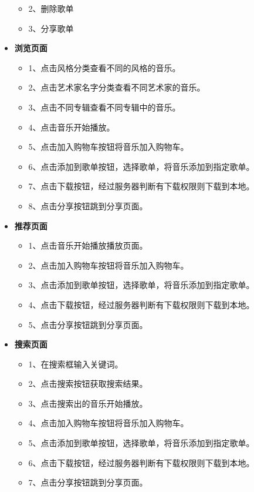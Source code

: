 \begin{itemize}
\begin{itemize}
		\item \textbf{}2、删除歌单
		\item \textbf{}3、分享歌单
	\end{itemize}
	\item \textbf{浏览页面}
	\begin{itemize}
		\item \textbf{}1、点击风格分类查看不同的风格的音乐。
		\item \textbf{}2、点击艺术家名字分类查看不同艺术家的音乐。
		\item \textbf{}3、点击不同专辑查看不同专辑中的音乐。
		\item \textbf{}4、点击音乐开始播放。
		\item \textbf{}5、点击加入购物车按钮将音乐加入购物车。
		\item \textbf{}6、点击添加到歌单按钮，选择歌单，将音乐添加到指定歌单。
		\item \textbf{}7、点击下载按钮，经过服务器判断有下载权限则下载到本地。
		\item \textbf{}8、点击分享按钮跳到分享页面。
	\end{itemize}
	\item \textbf{推荐页面}
	\begin{itemize}
		\item \textbf{}1、点击音乐开始播放播放页面。
		\item \textbf{}2、点击加入购物车按钮将音乐加入购物车。
		\item \textbf{}3、点击添加到歌单按钮，选择歌单，将音乐添加到指定歌单。
		\item \textbf{}4、点击下载按钮，经过服务器判断有下载权限则下载到本地。
		\item \textbf{}5、点击分享按钮跳到分享页面。
	\end{itemize}
	\item \textbf{搜索页面}
	\begin{itemize}
		\item \textbf{}1、在搜索框输入关键词。
		\item \textbf{}2、点击搜索按钮获取搜索结果。
		\item \textbf{}3、点击搜索出的音乐开始播放。
		\item \textbf{}4、点击加入购物车按钮将音乐加入购物车。
		\item \textbf{}5、点击添加到歌单按钮，选择歌单，将音乐添加到指定歌单。
		\item \textbf{}6、点击下载按钮，经过服务器判断有下载权限则下载到本地。
		\item \textbf{}7、点击分享按钮跳到分享页面。

\end{itemize}
\end{itemize}
